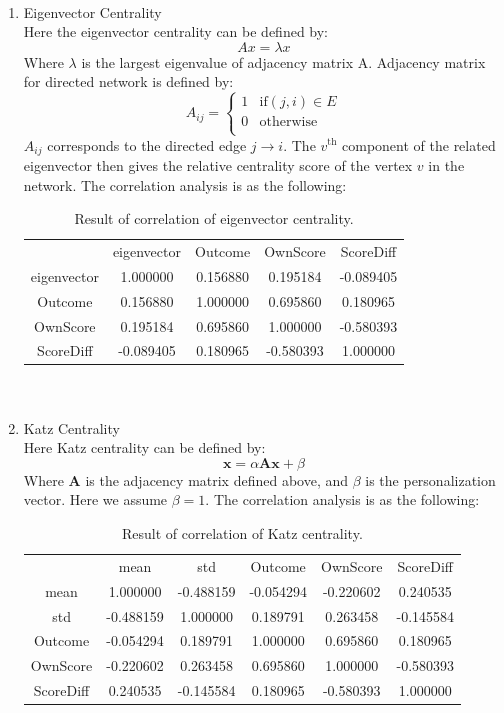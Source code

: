 \documentclass{mcmthesis}
\newcommand{\upcite}[1]{\textsuperscript{\textsuperscript{\cite{#1}}}}
\begin{document}
\begin{enumerate}
			\item Eigenvector Centrality\upcite{4} \\
			Here the eigenvector centrality can be defined by: 
			$$Ax=\lambda x$$
			Where $\lambda$ is the largest eigenvalue of adjacency matrix A. Adjacency matrix for directed network is defined by: 
			$$A_{ij}=\begin{cases}
			1 & \text{if} \left(j,i\right)\in E \\
			0 & \text{otherwise} \\
			\end{cases}$$
			$A_{ij}$ corresponds to the directed edge $j\rightarrow i$. The $v^\mathrm{th}$ component of the related eigenvector then gives the relative centrality score of the vertex $v$ in the network. The correlation analysis is as the following: 
			\begin{table}[h!]
				\centering
				\begin{tabular}{ccccc}
					\toprule
					 & eigenvector & Outcome & OwnScore & ScoreDiff \\
					eigenvector & 1.000000 & 0.156880 & 0.195184 & -0.089405 \\
					Outcome & 0.156880 & 1.000000 & 0.695860 & 0.180965 \\
					OwnScore & 0.195184 & 0.695860 & 1.000000 & -0.580393 \\
					ScoreDiff & -0.089405 & 0.180965 & -0.580393 & 1.000000 \\
					\bottomrule
				\end{tabular}
				\caption{Result of correlation of eigenvector centrality. }
			\end{table} \\
		
			\item Katz Centrality\upcite{4} \\
			Here Katz centrality can be defined by: 
			$$\mathbf{x}=\alpha\mathbf{Ax}+\beta$$
			Where $\mathbf{A}$ is the adjacency matrix defined above, and $\beta$ is the personalization vector. Here we assume $\beta=1$. The correlation analysis is as the following: 
			\begin{table}[h!]
				\centering
				\begin{tabular}{cccccc}
					\toprule
					 & mean & std & Outcome & OwnScore & ScoreDiff \\
					mean & 1.000000 & -0.488159 & -0.054294 & -0.220602 & 0.240535 \\
					std & -0.488159 & 1.000000 & 0.189791 & 0.263458 & -0.145584 \\
					Outcome & -0.054294 & 0.189791 & 1.000000 & 0.695860 & 0.180965 \\
					OwnScore & -0.220602 & 0.263458 & 0.695860 & 1.000000 & -0.580393 \\
					ScoreDiff & 0.240535 & -0.145584 & 0.180965 & -0.580393 & 1.000000 \\
					\bottomrule
				\end{tabular}
				\caption{Result of correlation of Katz centrality. }
			\end{table}
		\end{enumerate}
	
\end{document}
